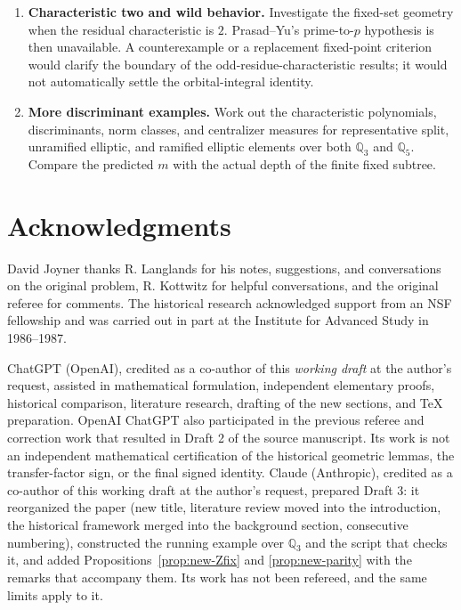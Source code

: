 \documentclass[12pt,letterpaper]{amsart}
\numberwithin{equation}{section}
\theoremstyle{definition}
\theoremstyle{plain}
\begin{document}
\begin{enumerate}
would detect exceptional characteristic leaves and the denominator
would record the tree branching. Test the ramified character
$\chi_E(3^r u)=(-1)^r(\bar u/3)$ and the $\mathbb Q_5$
analogue explicitly.
\item\textbf{Characteristic two and wild behavior.}
Investigate the fixed-set geometry when the residual characteristic
is $2$. Prasad--Yu's prime-to-$p$ hypothesis is then unavailable.
A counterexample or a replacement fixed-point criterion would
clarify the boundary of the odd-residue-characteristic results;
it would not automatically settle the orbital-integral identity.
\item\textbf{More discriminant examples.}
Work out the characteristic polynomials, discriminants, norm
classes, and centralizer measures for representative split,
unramified elliptic, and ramified elliptic elements over both
$\mathbb Q_3$ and $\mathbb Q_5$. Compare the predicted
$m$ with the actual depth of the finite fixed subtree.
\end{enumerate}


\section{Acknowledgments}
David Joyner thanks R. Langlands for his notes, suggestions, and
conversations on the original problem, R. Kottwitz for helpful
conversations, and the original referee for comments. The historical
research acknowledged support from an NSF fellowship and was carried
out in part at the Institute for Advanced Study in 1986--1987.

ChatGPT (OpenAI), credited as a co-author of this \emph{working draft}
at the author's request, assisted in mathematical formulation,
independent elementary proofs, historical comparison, literature
research, drafting of the new sections, and TeX preparation.
OpenAI ChatGPT also participated in the previous referee and correction
work that resulted in Draft 2 of the source manuscript. Its work is not
an independent mathematical certification of the historical geometric
lemmas, the transfer-factor sign, or the final signed identity.
Claude (Anthropic), credited as a co-author of this working draft
at the author's request, prepared Draft 3: it reorganized the paper (new
title, literature review moved into the introduction, the historical
framework merged into the background section, consecutive numbering),
constructed the running example over $\mathbb Q_3$ and the script
 that checks it, and added
Propositions~\ref{prop:new-Zfix} and \ref{prop:new-parity} with the
remarks that accompany them. Its work has not been refereed, and the
same limits apply to it.
\end{document}

